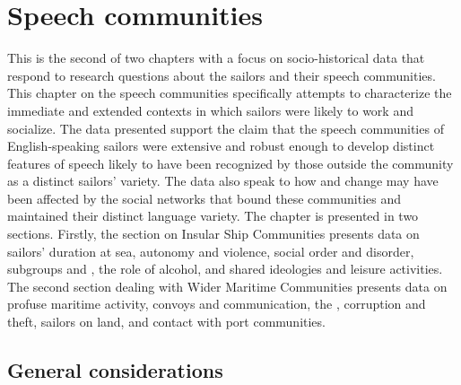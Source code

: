 \chapter{{Speech communities}}

This is the second of two chapters with a focus on socio-historical data that respond to research questions about the sailors and their speech communities. This chapter on the speech communities specifically attempts to characterize the immediate and extended contexts in which sailors were likely to work and socialize. The data presented support the claim that the speech communities of English-speaking sailors were extensive and robust enough to develop distinct features of speech likely to have been recognized by those outside the community as a distinct sailors’ variety. The data also speak to how  and change may have been affected by the social networks that bound these communities and maintained their distinct language variety. The chapter is presented in two sections. Firstly, the section on Insular Ship Communities presents data on sailors’ duration at sea, autonomy and violence, social order and disorder, subgroups and , the role of alcohol, and shared ideologies and leisure activities. The second section dealing with Wider Maritime Communities presents data on profuse maritime activity, convoys and communication, the , corruption and theft, sailors on land, and contact with port communities. 

\section{{General considerations}}%

